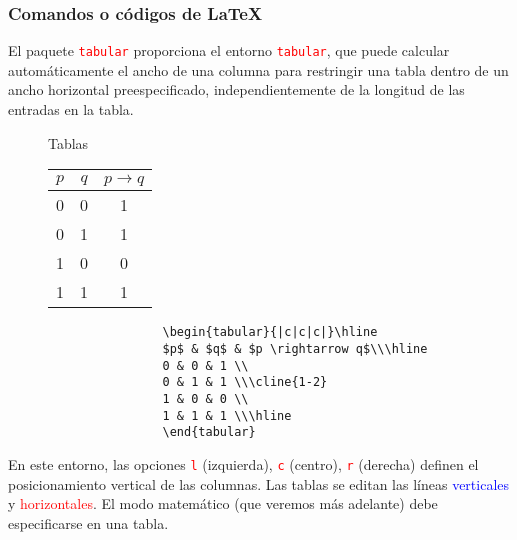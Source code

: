 \documentclass[11pt]{beamer}
\theoremstyle{plain} %
\theoremstyle{definition}
\begin{document}
    \begin{frame}[fragile]
    	\frametitle{Comandos o códigos de \LaTeX{}}
    	
    	El paquete \textcolor{red}{\texttt{tabular}} proporciona el entorno \textcolor{red}{\texttt{tabular}}, que puede calcular automáticamente el ancho de una columna para restringir una tabla dentro de un ancho horizontal preespecificado, independientemente de la longitud de las entradas en la tabla.
    	
    	\begin{figure}[!h]
    		\begin{minipage}[b]{0.25\textwidth}
    			\begin{block}{Tablas}
    				\begin{tabular}{|c|c|c|} \hline
    					$p$ & $q$ & $p \rightarrow q$ \\ \hline
    					0 & 0 & 1 \\
    					0 & 1 & 1 \\ \cline{1-2}
    					1 & 0 & 0 \\
    					1 & 1 & 1 \\ \hline
    				\end{tabular}
    			\end{block}
    		\end{minipage}
    		\hfill
    		\begin{minipage}[b]{0.7\textwidth}
    			\begin{verbatim}
    			\begin{tabular}{|c|c|c|}\hline
    			$p$ & $q$ & $p \rightarrow q$\\\hline
    			0 & 0 & 1 \\
    			0 & 1 & 1 \\\cline{1-2}
    			1 & 0 & 0 \\
    			1 & 1 & 1 \\\hline
    			\end{tabular}
    			\end{verbatim}
    		\end{minipage}
    	\end{figure}
    
        En este entorno, las opciones \textcolor{red}{\texttt{l}} (izquierda), \textcolor{red}{\texttt{c}} (centro), \textcolor{red}{\texttt{r}} (derecha) definen el posicionamiento vertical de las columnas. Las tablas se editan las líneas \textcolor{blue}{verticales} y \textcolor{red}{horizontales}. El modo matemático (que veremos más adelante) debe especificarse en una tabla.
    \end{frame}
\end{document}
